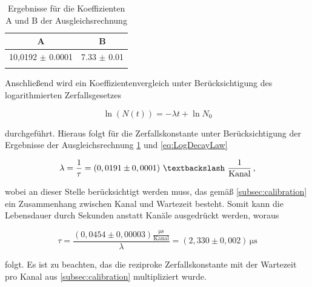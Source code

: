 \begin{table}[h!]
  \centering
\begin{tabular}{cc} \toprule
A   & B  \\ \midrule
10,0192 $\pm$ 0.0001 & 7.33 $\pm$ 0.01 \\
\bottomrule
\label{tab:Fit}
\end{tabular}
\caption{Ergebnisse für die Koeffizienten A und B der Ausgleichsrechnung}
\end{table}

Anschließend wird ein Koeffizientenvergleich unter Berücksichtigung des logarithmierten Zerfallsgesetzes

\begin{equation}
\ln(N(t)) = -\lambda t + \ln{N_0}
\label{eq:LogDecayLaw}
\end{equation}

\noindent durchgeführt. Hieraus folgt für die Zerfallskonstante unter Berücksichtigung der Ergebnisse der Ausgleichsrechnung \ref{tab:Fit} und \ref{eq:LogDecayLaw}

\begin{equation}
\lambda = \frac{1}{\tau} = (0,0191 \pm 0,0001) \,\, \textbackslash \,\, \frac{1}{\text{Kanal}}\,,
\end{equation}

\noindent wobei an dieser Stelle berücksichtigt werden muss, das gemäß \ref{subsec:calibration} ein Zusammenhang zwischen Kanal und Wartezeit besteht. Somit kann
die Lebensdauer durch Sekunden anstatt Kanäle ausgedrückt werden, woraus

\begin{equation}
\tau = \frac{(0,0454 \pm 0,00003) \frac{\si{\micro\second}}{\text{Kanal}}}{\lambda} = (2,330 \pm 0,002) \, \si{\micro\second}
\end{equation}

\noindent folgt. Es ist zu beachten, das die reziproke Zerfallskonstante mit der Wartezeit pro Kanal aus \ref{subsec:calibration} multipliziert wurde.
